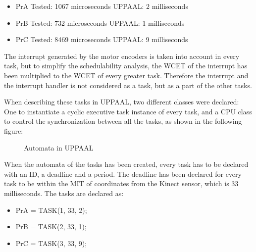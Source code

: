 \begin{itemize}
	\item PrA \tab Tested: 1067 microseconds \tab UPPAAL: 2 milliseconds
	\item PrB \tab Tested: 732  microseconds \tab UPPAAL: 1 milliseconds
	\item PrC \tab	Tested: 8469 microseconds \tab UPPAAL: 9 milliseconds
\end{itemize}

The interrupt generated by the motor encoders is taken into account in every task, but to simplify the schedulability analysis, the WCET of the interrupt has been multiplied to the WCET of every greater task. Therefore the interrupt and the interrupt handler is not considered as a task, but as a part of the other tasks.

When describing these tasks in UPPAAL, two different classes were declared: One to instantiate a cyclic executive task instance of every task, and a CPU class to control the synchronization between all the tasks, as shown in the following figure:

\begin{figure}[h]
	\centering
	\caption{Automata in UPPAAL}
	\label{UppaalModelAutomata}
\end{figure}

When the automata of the tasks has been created, every task has to be declared with an ID, a deadline and a period. The deadline has been declared for every task to be within the MIT of coordinates from the Kinect sensor, which is 33 milliseconds.
The tasks are declared as:

\begin{itemize}
	\item PrA = TASK(1, 33, 2);
	\item PrB = TASK(2, 33, 1);
	\item PrC = TASK(3, 33, 9);
\end{itemize}

